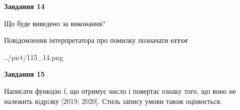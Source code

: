 \documentclass[11pt, ukrainian]{article}
\begin{document}
{\begin {large}
{\begin {center}\textbf{Завдання 14}\end {center}}\par
Що буде виведено за виконання? \par
Повідомлення інтерпретатора про помилку позначати \textbf{error}

\begin{center}
	{../pict/115_14.png}
\end{center}
\newpage

{\begin {center}\textbf{Завдання 15}\end {center}}\par

Написати функцiю f, що отримує число і повертає ознаку того, що воно не належить вiдрiзку [2019; 2020]. Стиль запису умови також оцінюється.\par
\newpage

\end {large}}
\end{document}
